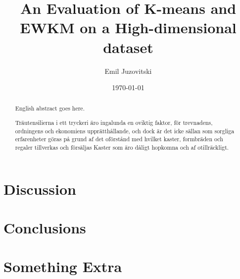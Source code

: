 \documentclass[master]{kththesis}
\title{An Evaluation of K-means and EWKM on a High-dimensional dataset}
\author{Emil Juzovitski}
\date{\today}
\begin{document}
\frontmatter

\titlepage

\begin{abstract}
  English abstract goes here.

\end{abstract}


\begin{otherlanguage}{swedish}
  \begin{abstract}
    Träutensilierna i ett tryckeri äro ingalunda en oviktig faktor,
    för trevnadens, ordningens och ekonomiens upprätthållande, och
    dock är det icke sällan som sorgliga erfarenheter göras på grund
    af det oförstånd med hvilket kaster, formbräden och regaler
    tillverkas och försäljas Kaster som äro dåligt hopkomna och af
    otillräckligt.
  \end{abstract}
\end{otherlanguage}


\tableofcontents


\mainmatter






\chapter{Discussion}

\chapter{Conclusions}

\printbibliography[heading=bibintoc]

\appendix

\chapter{Something Extra}

\tailmatter
\end{document}
